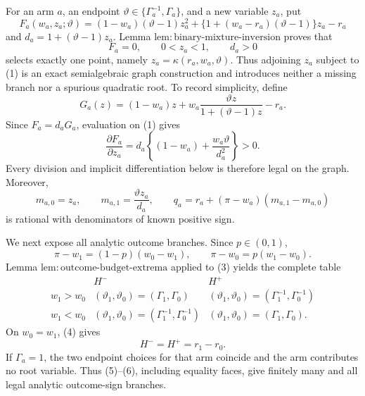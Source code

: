 For an arm \(a\), an endpoint \(\vartheta\in\{\Gamma_a^{-1},\Gamma_a\}\), and a new variable \(z_a\), put
\[
 F_a(w_a,z_a;\vartheta)
 =(1-w_a)(\vartheta-1)z_a^2
 +\{1+(w_a-r_a)(\vartheta-1)\}z_a-r_a
\]
and \(d_a=1+(\vartheta-1)z_a\).  Lemma \(\mathrm{lem{:}binary\text{-}mixture\text{-}inversion}\) proves that
\[
 F_a=0,\qquad 0<z_a<1,\qquad d_a>0                                      \tag{1}
\]
selects exactly one point, namely \(z_a=\kappa(r_a,w_a,\vartheta)\).  Thus adjoining \(z_a\) subject to (1) is an exact semialgebraic graph construction and introduces neither a missing branch nor a spurious quadratic root.  To record simplicity, define
\[
 G_a(z)=(1-w_a)z+w_a\frac{\vartheta z}{1+(\vartheta-1)z}-r_a.
\]
Since \(F_a=d_aG_a\), evaluation on (1) gives
\[
 \frac{\partial F_a}{\partial z_a}
 =d_a\left\{(1-w_a)+\frac{w_a\vartheta}{d_a^2}\right\}>0.              \tag{2}
\]
Every division and implicit differentiation below is therefore legal on the graph.  Moreover,
\[
 m_{a,0}=z_a,\qquad
 m_{a,1}=\frac{\vartheta z_a}{d_a},\qquad
 q_a=r_a+(\pi-w_a)(m_{a,1}-m_{a,0})                                    \tag{3}
\]
is rational with denominators of known positive sign.

We next expose all analytic outcome branches.  Since \(p\in(0,1)\),
\[
 \pi-w_1=(1-p)(w_0-w_1),
 \qquad
 \pi-w_0=p(w_1-w_0).                                                    \tag{4}
\]
Lemma \(\mathrm{lem{:}outcome\text{-}budget\text{-}extrema}\) applied to (3) yields the complete table
\[
\begin{array}{c|c|c}
 &H^-&H^+\\ \hline
 w_1>w_0&(\vartheta_1,\vartheta_0)=(\Gamma_1,\Gamma_0)
         &(\vartheta_1,\vartheta_0)=(\Gamma_1^{-1},\Gamma_0^{-1})\\
 w_1<w_0&(\vartheta_1,\vartheta_0)=(\Gamma_1^{-1},\Gamma_0^{-1})
         &(\vartheta_1,\vartheta_0)=(\Gamma_1,\Gamma_0).
\end{array}                                                             \tag{5}
\]
On \(w_0=w_1\), (4) gives
\[
 H^-=H^+=r_1-r_0.                                                       \tag{6}
\]
If \(\Gamma_a=1\), the two endpoint choices for that arm coincide and the arm contributes no root variable.  Thus (5)--(6), including equality faces, give finitely many and all legal analytic outcome-sign branches.

